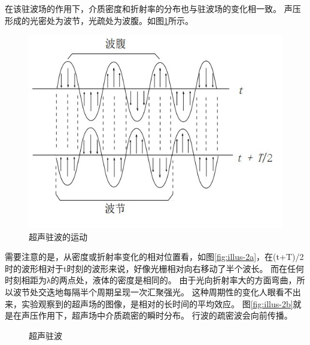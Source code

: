 \documentclass[12pt,a4paper,UTF8]{ctexart}
\begin{document}
	在该驻波场的作用下，介质密度和折射率的分布也与驻波场的变化相一致。
	声压形成的光密处为波节，光疏处为波腹。如图\ref{fig:illus-1}所示。
	\begin{figure}[htbp]
		\centering
		\includegraphics{attachments//illus-1.jpg}
		\caption{超声驻波的运动}
		\label{fig:illus-1}
	\end{figure}
	
	需要注意的是，从密度或折射率变化的相对位置看，如图\ref{fig:illus-2a}，在(t+T)/2时的波形相对于t时刻的波形来说，好像光栅相对向右移动了半个波长。
	而在任何时刻相距为λ的两点处，液体的密度是相同的。
	由于光向折射率大的方面弯曲，所以波节处交迭地每隔半个周期呈现一次汇聚强光。
	这种周期性的变化人眼看不出来，实验观察到的超声场的图像，是相对的长时间的平均效应。
	图\ref{fig:illus-2b}就是在声压作用下，超声场中介质疏密的瞬时分布。
	行波的疏密波会向前传播。
	\begin{figure}[htbp]
		\centering
		\caption{超声驻波}
	\end{figure}
\end{document}
